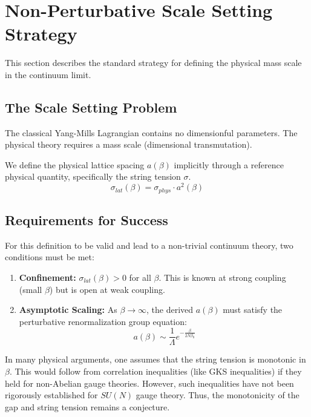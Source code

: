 \section{Non-Perturbative Scale Setting Strategy}
\label{sec:scale-setting}

This section describes the standard strategy for defining the physical mass scale in the continuum limit.

\subsection{The Scale Setting Problem}
The classical Yang-Mills Lagrangian contains no dimensionful parameters. The physical theory requires a mass scale (dimensional transmutation).

\begin{definition}
We define the physical lattice spacing $a(\beta)$ implicitly through a reference physical quantity, specifically the string tension $\sigma$. 
\[
\sigma_{lat}(\beta) = \sigma_{phys} \cdot a^2(\beta)
\]
\end{definition}

\subsection{Requirements for Success}
For this definition to be valid and lead to a non-trivial continuum theory, two conditions must be met:

\begin{enumerate}
    \item \textbf{Confinement:} $\sigma_{lat}(\beta) > 0$ for all $\beta$. This is known at strong coupling (small $\beta$) but is open at weak coupling.
    \item \textbf{Asymptotic Scaling:} As $\beta \to \infty$, the derived $a(\beta)$ must satisfy the perturbative renormalization group equation:
    \[
    a(\beta) \sim \frac{1}{\Lambda} e^{-\frac{\beta}{2N\beta_0}}
    \]
\end{enumerate}

\begin{remark}
In many physical arguments, one assumes that the string tension is monotonic in $\beta$. This would follow from correlation inequalities (like GKS inequalities) if they held for non-Abelian gauge theories. However, such inequalities have not been rigorously established for $SU(N)$ gauge theory. Thus, the monotonicity of the gap and string tension remains a conjecture.
\end{remark}
